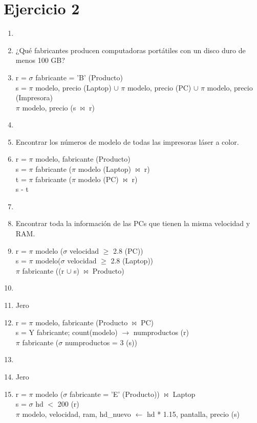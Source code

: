 \documentclass[a4paper, 12pt]{report}
\begin{document}
\section*{Ejercicio 2}{
\begin{enumerate}[label=\alph*)]
\item{}
\item{¿Qué fabricantes producen computadoras portátiles con un disco duro de
    menos 100 GB?}
\item{r = $\sigma$ fabricante = 'B' (Producto)\\
	s = $\pi$ modelo, precio (Laptop) $\cup$ $\pi$ modelo, precio (PC)
	$\cup$ $\pi$ modelo, precio (Impresora) \\
	$\pi$ modelo, precio (s $\Join$ r)}
\item{}
\item{Encontrar los números de modelo de todas las impresoras láser a color.}
\item{r = $\pi$ modelo, fabricante (Producto)\\
	s = $\pi$ fabricante ($\pi$ modelo (Laptop) $\Join$ r)\\
	t = $\pi$ fabricante ($\pi$ modelo (PC) $\Join$ r)\\
	s - t\\}
\item{}
\item{Encontrar toda la información de las PCs que tienen la misma velocidad y
    RAM.}
\item{r = $\pi$ modelo ($\sigma$ velocidad $\geq$ 2.8 (PC))\\
s = $\pi$ modelo($\sigma$ velocidad $\geq$ 2.8 (Laptop))\\
$\pi$ fabricante ((r $\cup$ s) $\Join$ Producto)\\
}
\item{}
\item{Jero}
\item{r = $\pi$ modelo, fabricante (Producto $\Join$ PC)\\
s = Y fabricante; count(modelo) $\rightarrow$ numproductos (r)\\
$\pi$ fabricante ($\sigma$ numproductos = 3 (s))}
\item{}
\item{Jero}
\item{r = $\pi$ modelo ($\sigma$ fabricante = 'E' (Producto)) $\Join$ Laptop\\
s = $\sigma$ hd $<$ 200 (r)\\
$\pi$ modelo, velocidad, ram, hd\_nuevo $\leftarrow$ hd * 1.15, pantalla, precio (s)\\
}
\end{enumerate}}
\end{document}
